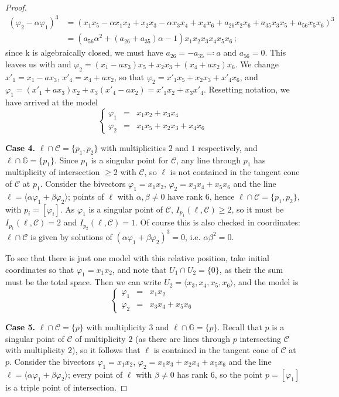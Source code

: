 \documentclass[10pt,reqno]{amsart}
\newcommand{\la}{\langle}
\newcommand{\ra}{\rangle}
\newcommand{\cC}{{\mathcal{C}}}
\newcommand{\GG}{\mathbb{G}}
\renewcommand{\a}{\alpha}
\renewcommand{\b}{\beta}
\newcommand{\f}{\varphi}
\newcommand{\kk}{\mathrm{k}}
\theoremstyle{definition}
\begin{document}
\begin{proof}
\begin{align*}
(\f_2-\a\f_1)^3 &= (x_1x_5 -\a x_1x_2 + x_2x_3 -\a x_3x_4 + x_4x_6 + a_{26}x_2x_6 + a_{35} x_3x_5 + a_{56}x_5x_6)^3\\
&=(a_{56}\a^2+(a_{26}+a_{35})\a-1)x_1x_2x_3x_4x_5x_6\,;
\end{align*}
since $\kk$ is algebraically closed, we must have $a_{26}=-a_{35}\eqqcolon a$ and $a_{56}=0$. This leaves us with and $\f_2=(x_1-ax_3)x_5+x_2x_3+(x_4+ax_2)x_6$. We change $x'_1=x_1-ax_3$, $x'_4=x_4+ax_2$, so that $\f_2=x'_1x_5+x_2x_3+x'_4x_6$, and $\f_1=(x'_1+ax_3)x_2+x_3(x'_4-ax_2)=x'_1x_2+x_3x'_4$. Resetting notation, we have arrived at the model
\[
\left\{\begin{array}{ccl}
 \f_1 & = & x_1x_2+x_3x_4\\
 \f_2 & = & x_1x_5+x_2x_3+x_4x_6
\end{array}\right.
\]

\medskip

\noindent \textbf{Case 4.} $\ell \cap \cC=\{p_1,p_2\}$ with multiplicities $2$ and $1$ respectively, and $\ell \cap \GG=\{p_1\}$. Since $p_1$ is a singular point for $\cC$, any line through $p_1$ has multiplicity of intersection $\ge 2$ with $\cC$, so $\ell$ is not contained in the tangent cone of $\cC$ at $p_1$. Consider the bivectors $\f_1=x_1x_2$, $\f_2=x_3x_4 + x_5x_6$ and the line $\ell=\la\a \f_1 + \b \f_2\ra$; points of $\ell$ with $\a, \b \ne 0$ have rank 6, hence $\ell\cap\cC=\{p_1,p_2\}$, with $p_i=[\f_i]$. As $\f_1$ is a singular point of $\cC$, $I_{p_1}(\ell,\cC)\geq 2$, so it must be $I_{p_1}(\ell,\cC)=2$ and $I_{p_2}(\ell,\cC)=1$. Of course this is also checked in coordinates: $\ell \cap \cC$ is given by solutions of $(\a \f_1+\b \f_2)^3=0$, i.e. $\a \b^2=0$.

\noindent To see that there is just one model with this relative position, take initial coordinates so that $\f_1=x_1x_2$, and note that $U_1 \cap U_2=\{0\}$, as their the sum must be the total space. Then we can write $U_2=\la x_3, x_4, x_5, x_6 \ra$, and the model is
\[
\left\{\begin{array}{ccl}
 \f_1 & = & x_1x_2\\
 \f_2 & = & x_3x_4+x_5x_6
\end{array}\right.
\]

\medskip

\noindent \textbf{Case 5.} $\ell \cap \cC=\{p\}$ with multiplicity $3$ and $\ell \cap \GG=\{p\}$. Recall that $p$ is a singular point of $\cC$ of multiplicity $2$ (as there are lines through $p$ intersecting $\cC$ with multiplicity $2$), so it follows that $\ell$ is contained in the tangent cone of $\cC$ at $p$.
Consider the bivectors $\f_1=x_1x_2$, $\f_2=x_1x_3+x_2x_4+x_5x_6$ and the line $\ell=\la\a \f_1 + \b \f_2\ra$; every point of $\ell$ with $\b\neq 0$ has rank $6$, so the point $p=[\f_1]$ is a triple point of intersection.


\end{proof}
\end{document}
